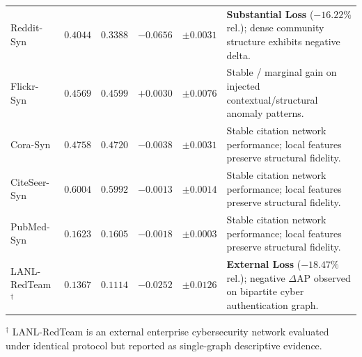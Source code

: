 \begin{table}[htbp]
\begin{tabularx}{\textwidth}{lrrrr>{\raggedright\arraybackslash}X}
Reddit-Syn & $0.4044$ & $0.3388$ & $\mathbf{-0.0656}$ & $\pm 0.0031$ & \textbf{Substantial Loss} ($-16.22\%$ rel.); dense community structure exhibits negative delta. \\
Flickr-Syn & $0.4569$ & $0.4599$ & $+0.0030$ & $\pm 0.0076$ & Stable / marginal gain on injected contextual/structural anomaly patterns. \\
Cora-Syn & $0.4758$ & $0.4720$ & $-0.0038$ & $\pm 0.0031$ & Stable citation network performance; local features preserve structural fidelity. \\
CiteSeer-Syn & $0.6004$ & $0.5992$ & $-0.0013$ & $\pm 0.0014$ & Stable citation network performance; local features preserve structural fidelity. \\
PubMed-Syn & $0.1623$ & $0.1605$ & $-0.0018$ & $\pm 0.0003$ & Stable citation network performance; local features preserve structural fidelity. \\
LANL-RedTeam$^{\dagger}$ & $0.1367$ & $0.1114$ & $-0.0252$ & $\pm 0.0126$ & \textbf{External Loss} ($-18.47\%$ rel.); negative $\Delta\mathrm{AP}$ observed on bipartite cyber authentication graph. \\
\bottomrule
\end{tabularx}
\begin{tablenotes}\footnotesize
\item $^{\dagger}$ LANL-RedTeam is an external enterprise cybersecurity network evaluated under identical protocol but reported as single-graph descriptive evidence.
\end{tablenotes}
\end{table}